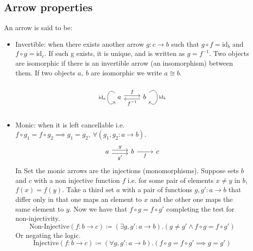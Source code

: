 \subsection{Arrow properties}
An arrow is said to be: \parencite{maclane:working_mathematician}
\begin{itemize}
  \item Invertible: when there exists another arrow $g:c \to b$ such that
    $g\circ f = \mathrm{id}_b$ and $f\circ g = \mathrm{id}_c$. If such g exists, it is unique, and
    is written as $g= f^{-1}$. Two objects are isomorphic if there is an
    invertible arrow (an insomorphism) between them. If two objects $a,\ b$
    are isomorphic we write $a\cong b$.
    \[\begin{tikzcd}
      a & b
      \arrow["f", shift left=1, from=1-1, to=1-2]
      \arrow["{f^{-1}}", shift left=1, from=1-2, to=1-1]
      \arrow["\mathrm{id}_a"', out=90+45, in=-90-45, looseness=4.5, from=1-1, to=1-1]
      \arrow["\mathrm{id}_b", out=45, in=-45, looseness=4.5, from=1-2, to=1-2]
    \end{tikzcd}\]
  \item Monic: when it is left cancellable i.e.
    $f \circ g_1 = f \circ g_2 \implies g_1 = g_2,\ \forall (g_1, g_2:a\to b)$.
    \[\begin{tikzcd}
      a & b & c
      \arrow["g", shift left=1, from=1-1, to=1-2]
      \arrow["{g'}"', shift right=1, from=1-1, to=1-2]
      \arrow["f"', from=1-2, to=1-3]
    \end{tikzcd}\]
    In Set the monic arrows are the injections (monomorphisms).
    Suppose sets $b$ and $c$ with a non injective function $f$ i.e. for some
    pair of elements $x \neq y$ in $b$, $f(x) = f(y)$. Take a third set $a$ with
    a pair of functions $g, g':a\to b$ that differ only in that one maps an
    element to $x$ and the other one maps the same element to $y$. Now we have
    that $f\circ g = f\circ g'$ completing the test for non-injectivity.
    \[\text{Non-Injective}(f:b\to c)
      \coloneq(\exists g, g':a\to b).(g \neq g' \land f\circ g = f\circ g')\]
    Or negating the logic.
    \[\text{Injective}(f:b\to c)
      \coloneq(\forall g, g':a\to b).(f\circ g = f\circ g' \implies g=g')\]


\end{itemize}
